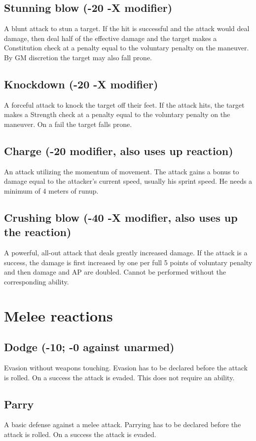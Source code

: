 \subsection*{Stunning blow (-20 -X modifier)}
A blunt attack to stun a target. If the hit is successful and the attack would deal damage, then deal half of the effective damage and the target makes a Constitution check at a penalty equal to the voluntary penalty on the maneuver. By GM discretion the target may also fall prone.
\subsection*{Knockdown (-20 -X modifier)}
A forceful attack to knock the target off their feet. If the attack hits, the target makes a Strength check at a penalty equal to the voluntary penalty on the maneuver. On a fail the target falls prone.
\subsection*{Charge (-20 modifier, also uses up reaction)}
An attack utilizing the momentum of movement. The attack gains a bonus to damage equal to the attacker’s current speed, usually his sprint speed. He needs a minimum of 4 meters of runup.
\subsection*{Crushing blow (-40 -X modifier, also uses up the reaction)}
A powerful, all-out attack that deals greatly increased damage. If the attack is a success, the damage is first increased by one per full 5 points of voluntary penalty and then damage and AP are doubled. Cannot be performed without the corresponding ability.

\section{Melee reactions}
\subsection*{Dodge (-10; -0 against unarmed)}
Evasion without weapons touching. Evasion has to be declared before the attack is rolled. On a success the attack is evaded. This does not require an ability.
\subsection*{Parry}
A basic defense against a melee attack. Parrying has to be declared before the attack is rolled. On a success the attack is evaded.
